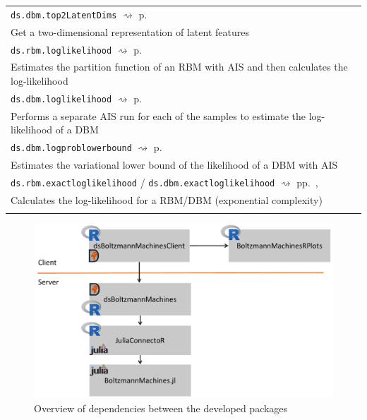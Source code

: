 \documentclass[12pt]{article}
\newcommand{\inlinecode}[1]{\texttt{#1}}
\newcommand{\rightpageref}[1]{\hfill $\rightsquigarrow$ p.\ \pageref{#1}}
\newcommand{\rightpagerefs}[2]{\hfill $\rightsquigarrow$ pp.\ \pageref{#1}, \pageref{#2}}
\begin{document}
\begin{table}[h]
\begin{tabularx}{\textwidth}{X}
\inlinecode{ds.dbm.top2LatentDims} \rightpageref{rdokitem_ds.dbm.top2LatentDims} \\
Get a two-dimensional representation of latent features \\
\inlinecode{ds.rbm.loglikelihood} \rightpageref{rdokitem_ds.rbm.loglikelihood} \\
Estimates the partition function of an RBM with AIS and then calculates the log-likelihood \\
\inlinecode{ds.dbm.loglikelihood} \rightpageref{rdokitem_ds.dbm.loglikelihood} \\
Performs a separate AIS run for each of the samples to estimate the log-likelihood of a DBM \\
\inlinecode{ds.dbm.logproblowerbound} \rightpageref{rdokitem_ds.dbm.logproblowerbound} \\
Estimates the variational lower bound of the likelihood of a DBM with AIS \\
\inlinecode{ds.rbm.exactloglikelihood} /
\inlinecode{ds.dbm.exactloglikelihood} \rightpagerefs{rdokitem_ds.dbm.exactloglikelihood}{rdokitem_ds.rbm.exactloglikelihood} \\
Calculates the log-likelihood for a RBM/DBM (exponential complexity)\\
   \Xhline{1pt}
\end{tabularx}
\end{table}



\begin{figure}[h]
   \centering
   \includegraphics[scale=0.5]{images/dsBoltzmannMachinesOverview.pdf}
   \caption{Overview of dependencies between the developed packages}
 \end{figure}
 
\end{document}
